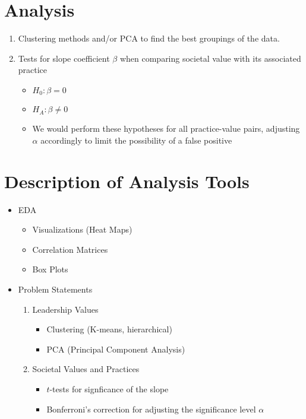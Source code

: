 \documentclass{article}
\begin{document}
\section{Analysis}

\begin{enumerate}
    \item Clustering methods and/or PCA to find the best groupings of the data.
    \item Tests for slope coefficient $\beta$ when comparing societal value with its associated practice
    \begin{itemize}
        \item $H_0: \beta = 0$
        \item $H_A: \beta \neq 0$
        \item We would perform these hypotheses for all practice-value pairs, adjusting $\alpha$ accordingly to limit the possibility of a false positive
    \end{itemize}
\end{enumerate}

\section{Description of Analysis Tools}

\begin{itemize}
    \item EDA
        \begin{itemize}
            \item Visualizations (Heat Maps)
            \item Correlation Matrices
            \item Box Plots
        \end{itemize}
    \item Problem Statements
        \begin{enumerate}
            \item Leadership Values
            \begin{itemize}
                \item Clustering (K-means, hierarchical)
                \item PCA (Principal Component Analysis)
            \end{itemize}
            \item Societal Values and Practices
            \begin{itemize}
                \item $t$-tests for signficance of the slope
                \item Bonferroni's correction for adjusting the significance level $\alpha$
            \end{itemize}
        \end{enumerate}
\end{itemize}
\end{document}
